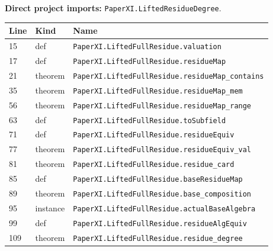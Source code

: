 \documentclass[10pt,oneside]{book}
\begin{document}

\textbf{Direct project imports:} \nolinkurl{PaperXI.LiftedResidueDegree}.

\begin{longtable}{@{}p{}p{}p{}@{}}\toprule Line&Kind&Name\\\midrule\endhead

15&def&\nolinkurl{PaperXI.LiftedFullResidue.valuation}\\

17&def&\nolinkurl{PaperXI.LiftedFullResidue.residueMap}\\

21&theorem&\nolinkurl{PaperXI.LiftedFullResidue.residueMap_contains}\\

35&theorem&\nolinkurl{PaperXI.LiftedFullResidue.residueMap_mem}\\

56&theorem&\nolinkurl{PaperXI.LiftedFullResidue.residueMap_range}\\

63&def&\nolinkurl{PaperXI.LiftedFullResidue.toSubfield}\\

71&def&\nolinkurl{PaperXI.LiftedFullResidue.residueEquiv}\\

77&theorem&\nolinkurl{PaperXI.LiftedFullResidue.residueEquiv_val}\\

81&theorem&\nolinkurl{PaperXI.LiftedFullResidue.residue_card}\\

85&def&\nolinkurl{PaperXI.LiftedFullResidue.baseResidueMap}\\

89&theorem&\nolinkurl{PaperXI.LiftedFullResidue.base_composition}\\

95&instance&\nolinkurl{PaperXI.LiftedFullResidue.actualBaseAlgebra}\\

99&def&\nolinkurl{PaperXI.LiftedFullResidue.residueAlgEquiv}\\

109&theorem&\nolinkurl{PaperXI.LiftedFullResidue.residue_degree}\\

\bottomrule\end{longtable}
\end{document}
